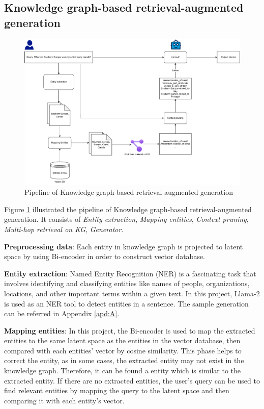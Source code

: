 \subsection{Knowledge graph-based retrieval-augmented generation}
\begin{figure}[hbt]
    \centering
    \includegraphics[width=0.95\linewidth]{experiements/image/kg-rag.pdf}
    \caption{Pipeline of Knowledge graph-based retrieval-augmented generation}
    \label{fig:p_kg}
\end{figure}

Figure \ref{fig:p_kg} illustrated the pipeline of Knowledge graph-based retrieval-augmented generation. It consists of \textit{Entity extraction}, \textit{Mapping entities}, \textit{Context pruning}, \textit{Multi-hop retrieval on KG}, \textit{Generator}.

\textbf{Preprocessing data}: Each entity in knowledge graph is projected to latent space by using Bi-encoder in order to construct vector database.

\textbf{Entity extraction}: Named Entity Recognition (NER) is a fascinating task that involves identifying and classifying entities like names of people, organizations, locations, and other important terms within a given text. In this project, Llama-2 is used as an NER tool to detect entities in a sentence. The sample generation can be referred in Appendix \ref{apd:A}.

\textbf{Mapping entities}: In this project, the Bi-encoder is used to map the extracted entities to the same latent space as the entities in the vector database, then compared with each entities' vector by cosine similarity. This phase helps to correct the entity, as in some cases, the extracted entity may not exist in the knowledge graph. Therefore, it can be found a entity which is similar to the extracted entity.
If there are no extracted entities, the user’s query can be used to find relevant entities by mapping the query to the latent space and then comparing it with each entity’s vector.

